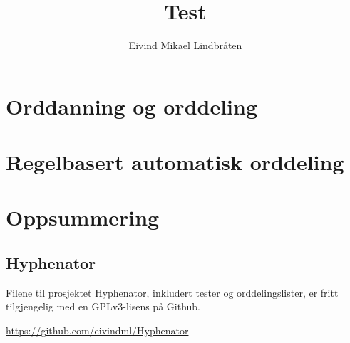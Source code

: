 \documentclass[12pt,a4paper,norsk]{uiothesis}
\author{Eivind Mikael Lindbråten}
\title{Test}
\begin{document}
 
	
	 \pagestyle{uio} 

	\maketitle
	\frontmatter 
	  \clearpage 
	
	\nocite{bringhurst1999elements} %
	 \cleardoublepage
	
	\tableofcontents \clearpage 
	\listoffigures \clearpage 
	\listoftables \clearpage
	\listoflistings
	

	

	\mainmatter 
	
	

	\part{Orddanning og orddeling}
	
	
	
	
	
	

	\part{Regelbasert automatisk orddeling}
	
	

	\part{Oppsummering}
	

    
    
    
    \appendix
	\chapter{Hyphenator}
	
	Filene til prosjektet Hyphenator, inkludert tester og orddelingslister, er fritt tilgjengelig med en GPLv3-lisens på Github. 
	
	\url{https://github.com/eivindml/Hyphenator}
	
%
\end{document}
